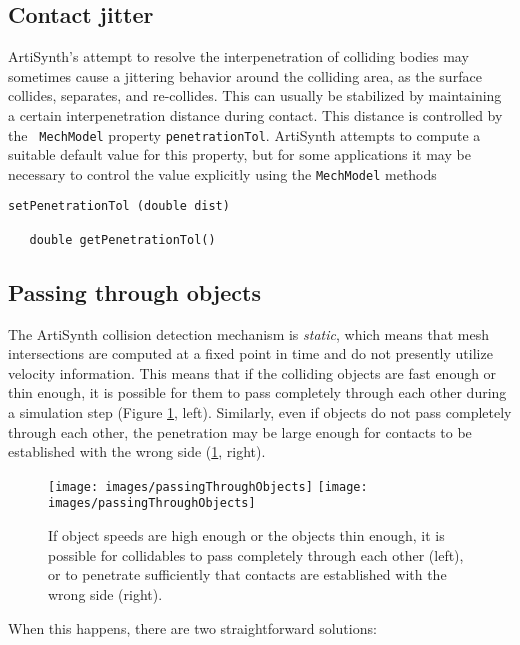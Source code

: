 \subsection{Contact jitter}

ArtiSynth's attempt to resolve the interpenetration of colliding
bodies may sometimes cause a jittering behavior around the colliding
area, as the surface collides, separates, and re-collides.  This can
usually be stabilized by maintaining a certain interpenetration
distance during contact. This distance is controlled by the {\tt
MechModel} property {\tt penetrationTol}.  ArtiSynth attempts to
compute a suitable default value for this property, but for some
applications it may be necessary to control the value explicitly using
the {\tt MechModel} methods
%
\begin{lstlisting}[]
   setPenetrationTol (double dist)

   double getPenetrationTol()
\end{lstlisting}
%
\subsection{Passing through objects}
\label{PassingThroughObjects:sec}

The ArtiSynth collision detection mechanism is {\it static}, which
means that mesh intersections are computed at a fixed point in time
and do not presently utilize velocity information. This means that if
the colliding objects are fast enough or thin enough, it is possible
for them to pass completely through each other during a simulation
step (Figure
\ref{passingThroughObjects:fig}, left). Similarly, even if objects
do not pass completely through each other, the penetration may be
large enough for contacts to be established with the wrong side
(\ref{passingThroughObjects:fig}, right).

\begin{figure}[ht]
\begin{center}
\iflatexml
 \texttt{[image: images/passingThroughObjects]}
\else
 \texttt{[image: images/passingThroughObjects]}
\fi
\end{center}
\caption{If object speeds are high enough or the objects thin enough, it
is possible for collidables to pass completely through each other
(left), or to penetrate sufficiently that contacts are established
with the wrong side (right).}
\label{passingThroughObjects:fig}
\end{figure}

When this happens, there are two straightforward solutions:

